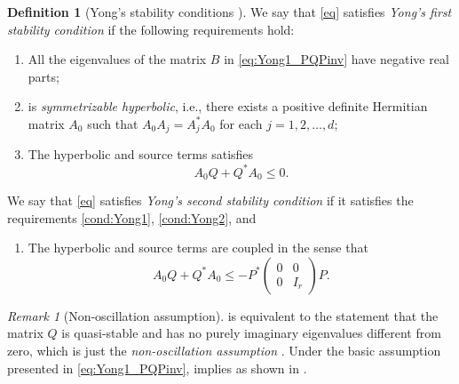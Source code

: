 \documentclass{article}
\theoremstyle{plain}%
\theoremstyle{definition}%
\newtheorem{definition}{Definition}%
\theoremstyle{remark}%
\newtheorem{remark}{Remark}%
\newcommand{\+}[1]{{\bm{#1}}}
\begin{document}
\begin{definition}[Yong's stability conditions \cite{Yong2001basic}]
  We say that \cref{eq} satisfies 
  \textit{Yong's first stability condition} 
  if the following requirements hold:
  \begin{enumerate}[label={(\roman{enumi})}]
    \item \label{cond:Yong1}
    All the eigenvalues of the matrix $B$ in \cref{eq:Yong1_PQPinv} 
    have negative real parts;
    \item \label{cond:Yong2}
     is \textit{symmetrizable hyperbolic}, i.e., there 
    exists a positive definite Hermitian matrix $A_0$ such that 
    $A_0 A_j = A_j^* A_0$
    for each $j = 1, 2, \ldots, d$;
    \item \label{cond:Yong3w}
    The hyperbolic and source terms satisfies 
    \begin{displaymath}
      A_0 Q + Q^* A_0 \le 0.
    \end{displaymath}
  \end{enumerate}
  We say that \cref{eq} satisfies 
  \textit{Yong's second stability condition} 
  if it satisfies the requirements 
  \ref{cond:Yong1}, \ref{cond:Yong2}, and 
  \begin{enumerate}[start=3,label={(\roman{enumi})$^\prime$}]
    \item \label{cond:Yong3s}
    The hyperbolic and source terms are coupled in the sense that 
    \begin{displaymath}
      A_0 Q + Q^* A_0 \le - P^* \begin{pmatrix}
        0 & 0 \\ 0 & I_r
      \end{pmatrix} P.
    \end{displaymath}
  \end{enumerate}
\end{definition}

\begin{remark}[Non-oscillation assumption]\label{rmk:yong->noa}
   is equivalent to the statement that the matrix 
  $Q$ is quasi-stable and has no purely imaginary eigenvalues 
  different from zero, which is just the 
  \textit{non-oscillation assumption} \cite{Yong_basic_2002}.
  Under the basic assumption presented in \cref{eq:Yong1_PQPinv}, 
   implies  as shown in 
  \cite[Lemma 2.1]{Yong_singular_1999}.
\end{remark}
\end{document}
